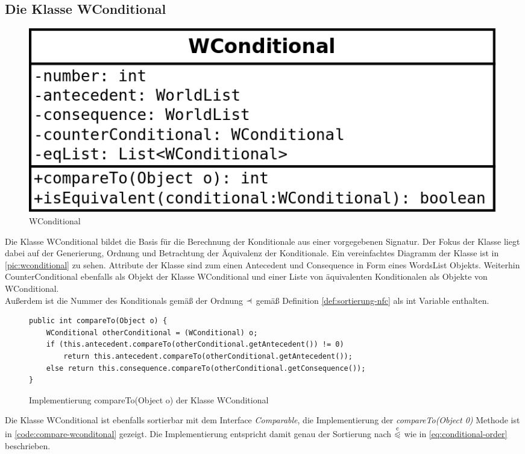 \documentclass[12pt,a4paper]{article}
\newcommand\dotll{\mathrel{%
    \mathchoice{\QEQQ}{\QEQQ}{\QEQQ}{\QEQQ}%
}}
\def\QEQQ{{%
    \setbox0\hbox{$\leqslant$}%
    \rlap{\hbox to \wd0{\hss \raisebox {1pt}{$\ \cdot$\hss}}}\box0
}}
\newcommand\rdotl{\mathrel{%
    \mathchoice{\RQEQ}{\RQEQ}{\RQEQ}{\RQEQ}%
}}
\def\RQEQ{{%
    \setbox0\hbox{$\prec$}%
    \rlap{\hbox to \wd0{\hss \raisebox {0.01pt}{$\ \cdot$\hss}}}\box0
}}
\begin{document}
\subsection{Die Klasse WConditional}

\begin{figure}
\includegraphics[width=0.55\linewidth]{bilder/wconditional.png}
\caption{WConditional}
\label{pic:wconditional}
\end{figure}

Die Klasse WConditional bildet die Basis für die Berechnung der Konditionale aus einer vorgegebenen Signatur. Der Fokus der Klasse liegt dabei auf der Generierung, Ordnung und Betrachtung der Äquivalenz der Konditionale. Ein vereinfachtes Diagramm der Klasse ist in \autoref{pic:wconditional} zu sehen. Attribute der Klasse sind zum einen Antecedent und Consequence in Form eines WordsList Objekts. Weiterhin CounterConditional ebenfalls als Objekt der Klasse WConditional und einer Liste von äquivalenten Konditionalen als Objekte von WConditional.\\
Außerdem ist die Nummer des Konditionals gemäß der Ordnung $\rdotl$ gemäß Definition \ref{def:sortierung-nfc} als int Variable enthalten.



\begin{figure}
\begin{lstlisting}
public int compareTo(Object o) {
    WConditional otherConditional = (WConditional) o;
    if (this.antecedent.compareTo(otherConditional.getAntecedent()) != 0)
        return this.antecedent.compareTo(otherConditional.getAntecedent());
    else return this.consequence.compareTo(otherConditional.getConsequence());
}
\end{lstlisting}
\caption{Implementierung compareTo(Object o) der Klasse WConditional}
\label{code:compare-wconditonal}
\end{figure}


Die Klasse WConditional ist ebenfalls sortierbar mit dem Interface \textit{Comparable}, die Implementierung der \textit{compareTo(Object 0)} Methode ist in \autoref{code:compare-wconditonal} gezeigt. Die Implementierung entspricht damit genau der Sortierung nach $\overset{\mathrm{c}}{\dotll}$ wie in \autoref{eq:conditional-order} beschrieben.
\end{document}
